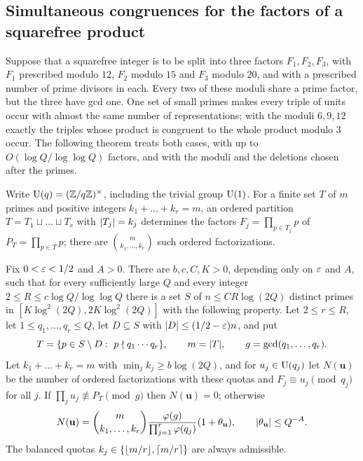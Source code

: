 \subsection{Simultaneous congruences for the factors of a squarefree product}\label{dir:sec:factorizations}

Suppose that a squarefree integer is to be split into three factors $F_1,F_2,F_3$, with $F_1$
prescribed modulo $12$, $F_2$ modulo $15$ and $F_3$ modulo $20$, and with a prescribed number of
prime divisors in each. Every two of these moduli share a prime factor, but the three have gcd
one. One set of small primes makes every triple of units occur with almost the same number of
representations; with the moduli $6,9,12$ exactly the triples whose product is congruent to the
whole product modulo $3$ occur. The following theorem treats both cases, with up to
$O(\log Q/\log\log Q)$ factors, and with the moduli and the deletions chosen after the primes.

Write $\mathrm{U}(q)=(\mathbb{Z}/q\mathbb{Z})^\times$, including the trivial group $\mathrm{U}(1)$. For a finite set $T$
of $m$ primes and positive integers $k_1+\dots+k_r=m$, an ordered partition
$T=T_1\sqcup\dots\sqcup T_r$ with $\lvert T_j\rvert=k_j$ determines the factors
$F_j=\prod_{p\in T_j}p$ of $P_T=\prod_{p\in T}p$; there are $\binom m{k_1,\dots,k_r}$ such
ordered factorizations.

\begin{theorem}\label{dir:thm:factorization}
Fix $0<\varepsilon<1/2$ and $A>0$. There are $b,c,C,K>0$, depending only on $\varepsilon$ and $A$, such that for
every sufficiently large $Q$ and every integer $2\le R\le c\log Q/\log\log Q$ there is a set $S$
of $n\le CR\log(2Q)$ distinct primes in $[K\log^2(2Q),2K\log^2(2Q)]$ with the following
property. Let $2\le r\le R$, let $1\le q_1,\dots,q_r\le Q$, let $D\subseteq S$ with
$\lvert D\rvert\le(1/2-\varepsilon)n$, and put
\[
 T=\{p\in S\setminus D:\ p\nmid q_1\cdots q_r\},\qquad m=\lvert T\rvert,\qquad
 g=\gcd(q_1,\dots,q_r).
\]
Let $k_1+\dots+k_r=m$ with $\min_jk_j\ge b\log(2Q)$, and for $u_j\in\mathrm{U}(q_j)$ let
$N(\mathbf u)$ be the number of ordered factorizations with these quotas and
$F_j\equiv u_j\pmod{q_j}$ for all $j$. If $\prod_ju_j\not\equiv P_T\pmod g$ then
$N(\mathbf u)=0$; otherwise
\begin{equation}\label{dir:eq:factorization}
 N(\mathbf u)=\binom m{k_1,\dots,k_r}\frac{\varphi(g)}{\prod_{j=1}^r\varphi(q_j)}
 (1+\theta_{\mathbf u}),\qquad\lvert\theta_{\mathbf u}\rvert\le Q^{-A}.
\end{equation}
The balanced quotas $k_j\in\{\lfloor m/r\rfloor,\lceil m/r\rceil\}$ are always admissible.
\end{theorem}

